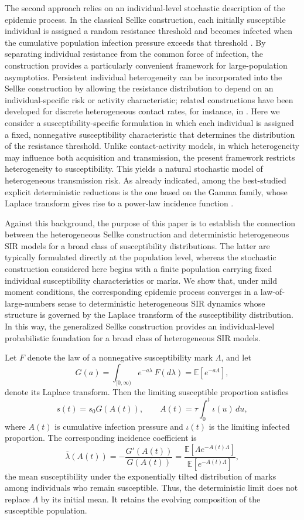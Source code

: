 \documentclass[pdflatex,sn-mathphys-ay]{sn-jnl}
\theoremstyle{thmstyleone}
\theoremstyle{thmstyletwo}
\theoremstyle{thmstylethree}
\newcommand{\E}{\mathbb{E}}
\begin{document}
The second approach relies on an individual-level stochastic description of
the epidemic process. In the classical  Sellke construction, each initially susceptible
individual is assigned a random resistance threshold and becomes infected when
the cumulative population infection pressure exceeds that threshold
\citep{Sellke1983}. By separating individual resistance from the common force
of infection, the construction provides a particularly convenient framework
for large-population asymptotics. Persistent individual heterogeneity can be incorporated into the Sellke construction by allowing the resistance distribution to depend on an individual-specific risk or activity characteristic; related constructions have been developed for discrete heterogeneous contact rates, for instance,  in \cite{House2014}. Here we consider a susceptibility-specific formulation in which each individual is assigned a fixed, nonnegative susceptibility characteristic that determines the distribution of the resistance threshold. Unlike contact-activity models, in which heterogeneity may influence both acquisition and transmission, the present framework restricts heterogeneity to susceptibility. This yields a
natural stochastic model of heterogeneous transmission risk. As already indicated, among the
best-studied explicit deterministic reductions is the one based on the Gamma family, whose
Laplace transform gives rise to a power-law incidence function
\citep{Novozhilov2008,GomesEtAl2022,DiekmannInaba2023}.

Against this background, the purpose of this paper is to establish the connection between the heterogeneous Sellke construction and deterministic heterogeneous SIR models for a broad class of 
susceptibility distributions. The latter are typically formulated directly at the population level, whereas the stochastic construction considered here begins with a finite population 
carrying fixed individual susceptibility characteristics or marks. We show that, under mild moment conditions, the corresponding epidemic process converges in a law-of-large-numbers sense to deterministic 
heterogeneous SIR dynamics whose structure is governed by the Laplace transform of the susceptibility distribution. In this way, 
the generalized Sellke construction provides an individual-level probabilistic foundation for a broad class of heterogeneous SIR models.

Let \(F\) denote the law of a nonnegative
susceptibility mark \(\Lambda\), and let 
\[
G(a)=\int_{[0,\infty)}e^{-a\lambda}\,F(d\lambda)
     =\E[e^{-a\Lambda}],
\] denote  its  Laplace transform. Then  the limiting susceptible proportion satisfies
\[
s(t)=s_0G(A(t)),
\qquad
A(t)=\tau\int_0^t\iota(u)\,du,
\]
where \(A(t)\) is cumulative infection pressure and  $\iota(t)$ is  the limiting  infected proportion. The corresponding incidence
coefficient is
\[
\overline{\lambda}(A(t))
=
-\frac{G'(A(t))}{G(A(t))}
=
\frac{\E[\Lambda e^{-A(t)\Lambda}]}
     {\E[e^{-A(t)\Lambda}]},
\]
the mean susceptibility under the exponentially tilted distribution of marks
among individuals who remain susceptible. Thus, the deterministic limit does
not replace \(\Lambda\) by its initial mean. It retains the evolving
composition of the susceptible population.
\end{document}
